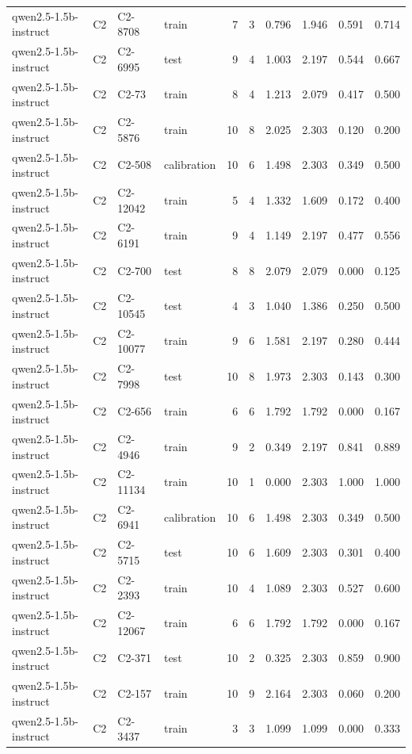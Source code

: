 \begin{table}
\begin{tabular}{llllrrrrrr}
qwen2.5-1.5b-instruct & C2 & C2-8708 & train & 7 & 3 & 0.796 & 1.946 & 0.591 & 0.714 \\
qwen2.5-1.5b-instruct & C2 & C2-6995 & test & 9 & 4 & 1.003 & 2.197 & 0.544 & 0.667 \\
qwen2.5-1.5b-instruct & C2 & C2-73 & train & 8 & 4 & 1.213 & 2.079 & 0.417 & 0.500 \\
qwen2.5-1.5b-instruct & C2 & C2-5876 & train & 10 & 8 & 2.025 & 2.303 & 0.120 & 0.200 \\
qwen2.5-1.5b-instruct & C2 & C2-508 & calibration & 10 & 6 & 1.498 & 2.303 & 0.349 & 0.500 \\
qwen2.5-1.5b-instruct & C2 & C2-12042 & train & 5 & 4 & 1.332 & 1.609 & 0.172 & 0.400 \\
qwen2.5-1.5b-instruct & C2 & C2-6191 & train & 9 & 4 & 1.149 & 2.197 & 0.477 & 0.556 \\
qwen2.5-1.5b-instruct & C2 & C2-700 & test & 8 & 8 & 2.079 & 2.079 & 0.000 & 0.125 \\
qwen2.5-1.5b-instruct & C2 & C2-10545 & test & 4 & 3 & 1.040 & 1.386 & 0.250 & 0.500 \\
qwen2.5-1.5b-instruct & C2 & C2-10077 & train & 9 & 6 & 1.581 & 2.197 & 0.280 & 0.444 \\
qwen2.5-1.5b-instruct & C2 & C2-7998 & test & 10 & 8 & 1.973 & 2.303 & 0.143 & 0.300 \\
qwen2.5-1.5b-instruct & C2 & C2-656 & train & 6 & 6 & 1.792 & 1.792 & 0.000 & 0.167 \\
qwen2.5-1.5b-instruct & C2 & C2-4946 & train & 9 & 2 & 0.349 & 2.197 & 0.841 & 0.889 \\
qwen2.5-1.5b-instruct & C2 & C2-11134 & train & 10 & 1 & 0.000 & 2.303 & 1.000 & 1.000 \\
qwen2.5-1.5b-instruct & C2 & C2-6941 & calibration & 10 & 6 & 1.498 & 2.303 & 0.349 & 0.500 \\
qwen2.5-1.5b-instruct & C2 & C2-5715 & test & 10 & 6 & 1.609 & 2.303 & 0.301 & 0.400 \\
qwen2.5-1.5b-instruct & C2 & C2-2393 & train & 10 & 4 & 1.089 & 2.303 & 0.527 & 0.600 \\
qwen2.5-1.5b-instruct & C2 & C2-12067 & train & 6 & 6 & 1.792 & 1.792 & 0.000 & 0.167 \\
qwen2.5-1.5b-instruct & C2 & C2-371 & test & 10 & 2 & 0.325 & 2.303 & 0.859 & 0.900 \\
qwen2.5-1.5b-instruct & C2 & C2-157 & train & 10 & 9 & 2.164 & 2.303 & 0.060 & 0.200 \\
qwen2.5-1.5b-instruct & C2 & C2-3437 & train & 3 & 3 & 1.099 & 1.099 & 0.000 & 0.333 \\

\end{tabular}
\end{table}
